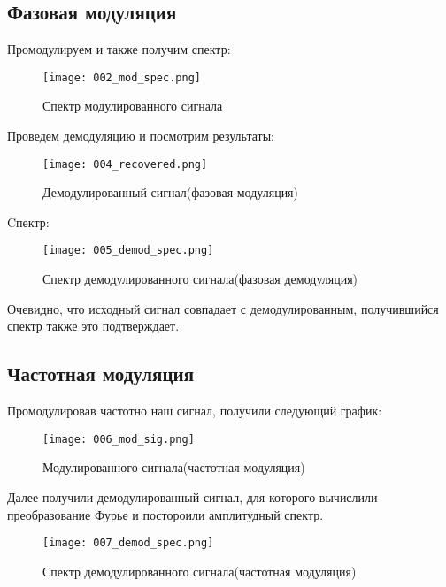 \subsection{Фазовая модуляция}
Промодулируем и также получим спектр:
\begin{figure}[H]
	\begin{center}
		\texttt{[image: 002\_mod\_spec.png]}
		\caption{Спектр модулированного сигнала} 
		\label{pic:003} %
	\end{center}
\end{figure}
Проведем демодуляцию и посмотрим результаты:
\begin{figure}[H]
	\begin{center}
		\texttt{[image: 004\_recovered.png]}
		\caption{Демодулированный сигнал(фазовая модуляция)} 
		\label{pic:004} %
	\end{center}
\end{figure}
Cпектр:
\begin{figure}[H]
	\begin{center}
		\texttt{[image: 005\_demod\_spec.png]}
		\caption{Спектр демодулированного сигнала(фазовая демодуляция)} 
		\label{pic:005} %
	\end{center}
\end{figure} 
Очевидно, что исходный сигнал совпадает с демодулированным, получившийся спектр также это подтверждает.   

\subsection{Частотная модуляция}
Промодулировав частотно наш сигнал, получили следующий график:
\begin{figure}[H]
	\begin{center}
		\texttt{[image: 006\_mod\_sig.png]}
		\caption{Модулированного сигнала(частотная модуляция)} 
		\label{pic:006} %
	\end{center}
\end{figure} 
Далее получили демодулированный сигнал, для которого вычислили преобразование Фурье и постороили амплитудный спектр.
\begin{figure}[H]
	\begin{center}
		\texttt{[image: 007\_demod\_spec.png]}
		\caption{Спектр демодулированного сигнала(частотная модуляция)} 
		\label{pic:007} %
	\end{center}
\end{figure} 

